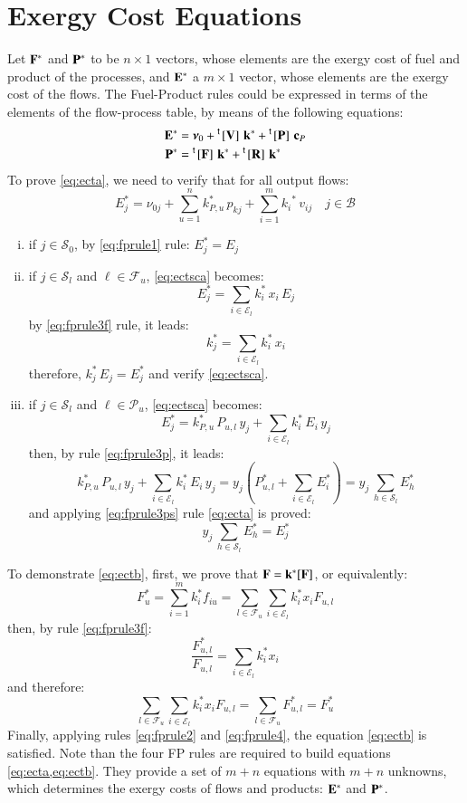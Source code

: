 \documentclass{ecos2018}
\begin{document}
\section{Exergy Cost Equations}
Let $\mathbf{F}^*$ and $\mathbf{P}^*$ to be $n\times1$ vectors, whose elements are the exergy cost of fuel and product of the processes, and $\mathbf{E}^*$ a $m\times1$ vector, whose elements are the exergy cost of the flows.
The Fuel-Product rules could be expressed in terms of the elements of the flow-process table, by means of the following equations:
\begin{align}
\mathbf{E}^{*}&=\bm{\nu}_0+\prescript{\smash{\mathsf{t}}}{}{\mskip-1mu}\left[ \textbf{V} \right]\,\mathbf{k}^{*}+\prescript{\smash{\mathsf{t}}}{}{\mskip-1mu}\left[ \textbf{P} \right]\,\mathbf{c}_P \label{eq:ecta}\\
\mathbf{P}^{*}&= \prescript{\smash{\mathsf{t}}}{}{\mskip-1mu}\left[ \textbf{F} \right]\,\mathbf{k}^{*}+ \prescript{\smash{\mathsf{t}}}{}{\mskip-1mu}\left[ \textbf{R} \right]\,\mathbf{k}^{*} \label{eq:ectb}
\end{align}
To prove \cref{eq:ecta}, we need to verify that for all output flows:
\begin{equation}
\label{eq:ectsca}
E_{j}^{*}=\nu_{0j}+\sum_{u=1}^{n}{k_{P,u}^{*}\,p_{kj}+\sum_{i=1}^{m}{k_{i}}^{*}\,v_{ij}} \quad j\in\mathcal{B}
\end{equation}
\begin{enumerate}[i)]
	\item if $j\in\mathcal{S}_0$, by \ref{eq:fprule1} rule: $E_j^*=E_j$
	\item if $j\in\mathcal{S}_l$ and $\ell\in\mathcal{F}_u$, \cref{eq:ectsca} becomes:
	\[
	E_j^*=\sum_{i\in\mathcal{E}_l}{k_i^*\,x_i\,E_j}
	\]
	by \ref{eq:fprule3f} rule, it leads:
	\[
	k_j^*=\sum_{i\in\mathcal{E}_l}{k_i^*\,x_i}
	\]
	therefore, $k_j^*\,E_j=E_j^*$ and verify \cref{eq:ectsca}.
	\item if $j\in\mathcal{S}_l$ and $\ell\in\mathcal{P}_u$, \cref{eq:ectsca} becomes:
	\[
	E_j^*=k_{P,u}^*\,P_{u,l}\,y_j+\sum_{i\in\mathcal{E}_l}{k_i^*\,E_i\,y_j} 
	\]
	then, by rule \ref{eq:fprule3p}, it leads:
	\[
	k_{P,u}^*\,P_{u,l}\,y_j+\sum_{i\in\mathcal{E}_l}{k_i^*\,E_i\,y_j}=
	y_j\left(P_{u,l}^{*}+\sum_{i\in\mathcal{E}_l}{E_i^*}\right)=y_j\,\sum_{h\in\mathcal{S}_l}{E_h^*}
	\]
	and applying \ref{eq:fprule3ps} rule \cref{eq:ecta} is proved:
	\[
	y_j\,\sum_{h\in\mathcal{S}_l}{E_h^*}=E_j^*
	\]
\end{enumerate}
To demonstrate \cref{eq:ectb}, first, we prove that $\mathbf{F}=\mathbf{k}^*[\mathbf{F}]$, or equivalently:
\begin{equation}
F_u^*=\sum_{i=1}^{m}{k_i^* f_{iu}}=\sum_{l\in\mathcal{F}_u}{\sum_{i\in\mathcal{E}_l}{k_i^* x_i F_{u,l}}}
\end{equation}
then, by rule \ref{eq:fprule3f}:
\[
\frac{F_{u,l}^*}{F_{u,l}}=\sum_{i\in\mathcal{E}_l}{k_i^*x_i}
\]
and therefore:
\[
\sum_{l\in\mathcal{F}_u}{\sum_{i\in\mathcal{E}_l}{k_i^* x_i F_{u,l}}=\sum_{l\in\mathcal{F}_u}{F_{u,l}^*}}=F_u^*
\]
Finally, applying rules \ref{eq:fprule2} and \ref{eq:fprule4}, the equation \eqref{eq:ectb} is satisfied.
Note than the four FP rules are required to build equations \cref{eq:ecta,eq:ectb}. They provide a set of $m+n$ equations with $m+n$ unknowns, which determines the exergy costs of flows and products: $\mathbf{E}^*$ and $\mathbf{P}^*$.
\end{document}

